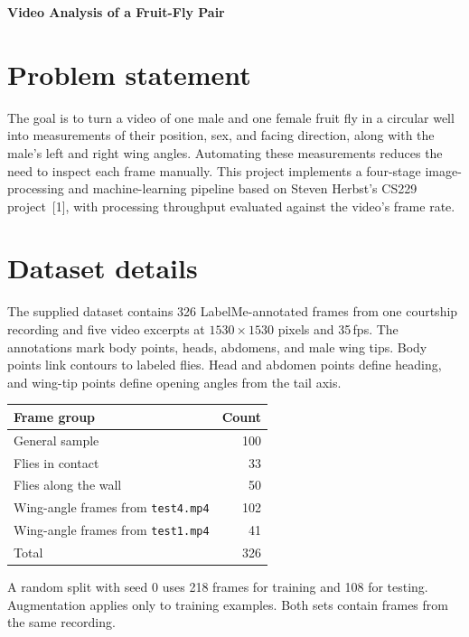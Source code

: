 \documentclass[11pt]{article}
\begin{document}
\begin{center}
{\Large\bfseries Video Analysis of a Fruit-Fly Pair}
\end{center}

\section*{Problem statement}
The goal is to turn a video of one male and one female fruit fly in a circular well into measurements of their position, sex, and facing direction, along with the male's left and right wing angles. Automating these measurements reduces the need to inspect each frame manually. This project implements a four-stage image-processing and machine-learning pipeline based on Steven Herbst's CS229 project~[1], with processing throughput evaluated against the video's frame rate.

\section*{Dataset details}
The supplied dataset contains 326 LabelMe-annotated frames from one courtship recording and five video excerpts at $1530\times1530$ pixels and 35\,fps. The annotations mark body points, heads, abdomens, and male wing tips. Body points link contours to labeled flies. Head and abdomen points define heading, and wing-tip points define opening angles from the tail axis.

\begin{center}
\begin{tabular}{@{}lr@{}}
\toprule
Frame group & Count \\
\midrule
General sample & 100 \\
Flies in contact & 33 \\
Flies along the wall & 50 \\
Wing-angle frames from \texttt{test4.mp4} & 102 \\
Wing-angle frames from \texttt{test1.mp4} & 41 \\
\midrule
Total & 326 \\
\bottomrule
\end{tabular}
\end{center}

A random split with seed 0 uses 218 frames for training and 108 for testing. Augmentation applies only to training examples. Both sets contain frames from the same recording.
\end{document}
